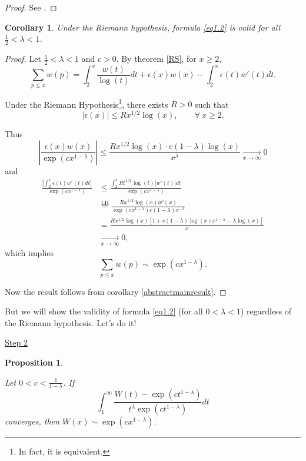 \documentclass[11pt]{amsart}
\newtheorem{corollary}[theorem]{Corollary}
\newtheorem{proposition}[theorem]{Proposition}
\numberwithin{equation}{section}
\newcommand{\disum}{\displaystyle \sum}
\newcommand{\diint}{\displaystyle \int}
\newcommand{\difrac}{\displaystyle \frac}
\begin{document}
\begin{proof} See \cite{BS}. \end{proof}

\begin{corollary}

Under the Riemann hypothesis, formula \ref{eq1.2} is valid for all $\difrac{1}{2} < \lambda < 1$.

\end{corollary}

\begin{proof} Let $\difrac{1}{2} < \lambda < 1$ and $c > 0$. By theorem \ref{RS}, for $x \geq 2$, $$\disum_{p \leq x} w(p) = \diint_{2}^{x} \difrac{w(t)}{\log(t)} dt + \epsilon(x)w(x) - \diint_{2}^{x} \epsilon(t)w'(t) dt.$$

Under the Riemann Hypothesis\footnote{In fact, it is equivalent.}, there exists $R > 0$ such that $$|\epsilon(x)| \leq Rx^{1/2}\log(x), \qquad \forall \ x \geq 2.$$

Thus $$\left| \difrac{\epsilon(x)w(x)}{\exp(cx^{1 - \lambda})} \right| \leq \difrac{Rx^{1/2}\log(x) \cdot c(1 - \lambda)\log(x)}{x^{\lambda}} \xrightarrow[x \to \infty]{} 0$$ and \begin{equation*} \begin{split} \difrac{\left|\diint_{2}^{x} \epsilon(t)w'(t) dt \right|}{\exp(cx^{1 - \lambda})} & \leq \difrac{\diint_{2}^{x} Rt^{1/2}\log(t)|w'(t)| dt}{\exp(cx^{1 - \lambda})} \\ & \overset{\text{LH}}{=} \difrac{Rx^{1/2}\log(x)w'(x)}{\exp(cx^{1 - \lambda})c(1 - \lambda)x^{-\lambda}} \\ & = \difrac{Rx^{1/2}\log(x)[1 + c(1 - \lambda)\log(x)x^{1 - \lambda} - \lambda \log(x)]}{x} \\ & \xrightarrow[x \to \infty]{} 0, \end{split} \end{equation*} which implies $$\disum_{p \leq x} w(p) \sim \exp(cx^{1 - \lambda}).$$

Now the result follows from corollary \ref{abstractmainresult}. \end{proof}

But we will show the validity of formula \ref{eq1.2} (for all $0 < \lambda < 1$) regardless of the Riemann hypothesis. Let's do it!

\begin{center} \underline{Step 2} \end{center}

\begin{proposition} \label{step2}

Let $0 < c < \difrac{1}{1 - \lambda}$. If $$\diint_{1}^{\infty} \difrac{W(t) - \exp(ct^{1 - \lambda})}{t^{\lambda}\exp(ct^{1 - \lambda})} dt$$ converges, then $W(x) \sim \exp(cx^{1 - \lambda})$.

\end{proposition}
\end{document}
